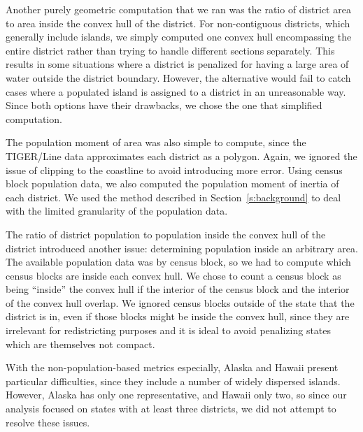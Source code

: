 \documentclass[12pt]{article}
\begin{document}
  Another purely geometric computation that we ran was the ratio of district area to area inside the convex hull of the district. For non-contiguous districts, which generally include islands, we simply computed one convex hull encompassing the entire district rather than trying to handle different sections separately. This results in some situations where a district is penalized for having a large area of water outside the district boundary. However, the alternative would fail to catch cases where a populated island is assigned to a district in an unreasonable way. Since both options have their drawbacks, we chose the one that simplified computation.

  The population moment of area was also simple to compute, since the TIGER/Line data approximates each district as a polygon.  Again, we ignored the issue of clipping to the coastline to avoid introducing more error.  Using census block population data, we also computed the population moment of inertia of each district.  We used the method described in Section~\ref{s:background} to deal with the limited granularity of the population data.

  The ratio of district population to population inside the convex hull of the district introduced another issue: determining population inside an arbitrary area. The available population data was by census block, so we had to compute which census blocks are inside each convex hull. We chose to count a census block as being ``inside'' the convex hull if the interior of the census block and the interior of the convex hull overlap. We ignored census blocks outside of the state that the district is in, even if those blocks might be inside the convex hull, since they are irrelevant for redistricting purposes and it is ideal to avoid penalizing states which are themselves not compact.

  With the non-population-based metrics especially, Alaska and Hawaii present particular difficulties, since they include a number of widely dispersed islands.  However, Alaska has only one representative, and Hawaii only two, so since our analysis focused on states with at least three districts, we did not attempt to resolve these issues.
\end{document}
